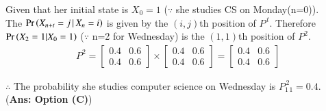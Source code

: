 \par Given that her initial state is $X_0=1$ ($\because$ she studies CS on Monday(n=0)).\\ The $\Pr\left(X_{n+t}=j \, |\, X_{n}=i\right)$ is given by the $(i,j)$th position of $P^{\,t}$. Therefore $\Pr\left(X_{2}=1 | X_{0}=1\right)$ ($\because$ n=2 for Wednesday) is the $(1,1)$th position of $P^2$.
\begin{align}
    P^2=\begin{bmatrix}
0.4 & 0.6 \\
0.4 & 0.6
\end{bmatrix}\times
\begin{bmatrix}
0.4 & 0.6 \\
0.4 & 0.6 
\end{bmatrix}=
\begin{bmatrix}
0.4 & 0.6 \\
0.4 & 0.6 
\end{bmatrix}
\end{align}
\par $\therefore$ The probability she studies computer science on Wednesday is $P_{1\,1}^{\,2} = 0.4$.\\
(\textbf{Ans: Option (C)})
